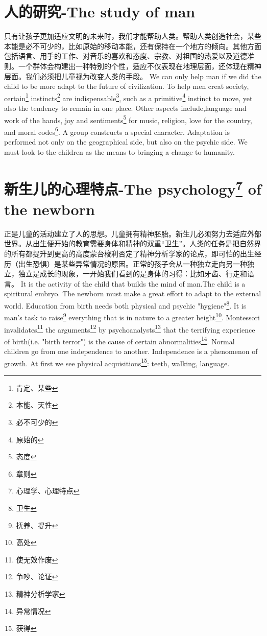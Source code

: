\documentclass[lang=cn,10pt]{elegantbook}
\begin{document}
\chapter{人的研究-The study of man}

\begin{tcolorbox}[title=摘要,
colback=red!5!white,
colframe=red!75!black,
fonttitle=\bfseries]
只有让孩子更加适应文明的未来时，我们才能帮助人类。帮助人类创造社会，某些本能是必不可少的，比如原始的移动本能，还有保持在一个地方的倾向。其他方面包括语言、用手的工作、对音乐的喜欢和态度、宗教、对祖国的热爱以及道德准则。一个群体会构建出一种特别的个性，适应不仅表现在地理层面，还体现在精神层面。我们必须把儿童视为改变人类的手段。
We can only help man if we did the child to be more adapt to the future of civilization. To help men creat society, certain\footnote{肯定、某些} instincts\footnote{本能、天性} are indispensable\footnote{必不可少的}, such as a primitive\footnote{原始的} instinct to move, yet also the tendency to remain in one place. Other aspects include,language and work of the hands, joy and sentiments\footnote{态度} for music, religion, love for the country, and moral codes\footnote{章则}. A group constructs a special character. Adaptation is performed not only on the geographical side, but also on the psychic side. We must look to the children as the means to bringing a change to humanity.
\end{tcolorbox}

\chapter{新生儿的心理特点-The psychology\footnote{心理学、心理特点} of the newborn}

\begin{tcolorbox}[title=摘要,
colback=red!5!white,
colframe=red!75!black,
fonttitle=\bfseries]
正是儿童的活动建立了人的思想。儿童拥有精神胚胎。新生儿必须努力去适应外部世界。从出生便开始的教育需要身体和精神的双重“卫生”。人类的任务是把自然界的所有都提升到更高的高度蒙台梭利否定了精神分析学家的论点，即可怕的出生经历（出生恐惧）是某些异常情况的原因。正常的孩子会从一种独立走向另一种独立，独立是成长的现象，一开始我们看到的是身体的习得：比如牙齿、行走和语言。
It is the activity of the child that builds the mind of man.The child is a spiritural embryo. The newborn must make a great effort to adapt to the external world. Education from birth needs both physical and psychic "hygiene"\footnote{卫生}. It is man's task to raise\footnote{抚养、提升} everything that is in nature to a greater height\footnote{高处}. Montessori invalidates\footnote{使无效作废} the arguments\footnote{争吵、论证} by psychoanalysts\footnote{精神分析学家} that the terrifying experience of birth(i.e. "birth terror") is the cause of certain abnormalities\footnote{异常情况}. Normal children go from one independence to another. Independence is a phenomenon of growth. At first we see physical acquisitions\footnote{获得}: teeth, walking, language.
\end{tcolorbox}
\end{document}
